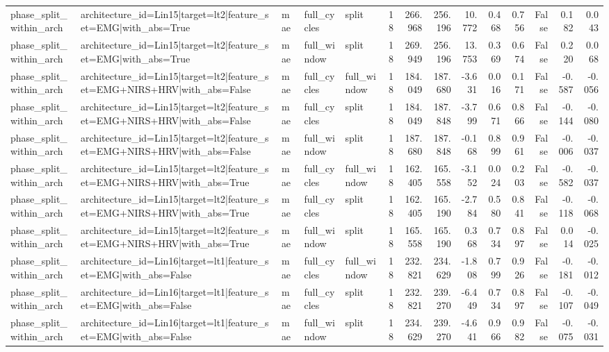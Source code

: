 \begin{table}
\begin{tabular}{lllllrrrrrrrrr}
phase_split_within_arch & architecture_id=Lin15|target=lt2|feature_set=EMG|with_abs=True & mae & full_cycles & split & 18 & 266.968 & 256.196 & 10.772 & 0.468 & 0.756 & False & 0.182 & 0.043 \\
phase_split_within_arch & architecture_id=Lin15|target=lt2|feature_set=EMG|with_abs=True & mae & full_window & split & 18 & 269.949 & 256.196 & 13.753 & 0.369 & 0.674 & False & 0.220 & 0.068 \\
phase_split_within_arch & architecture_id=Lin15|target=lt2|feature_set=EMG+NIRS+HRV|with_abs=False & mae & full_cycles & full_window & 18 & 184.049 & 187.680 & -3.631 & 0.016 & 0.171 & False & -0.587 & -0.056 \\
phase_split_within_arch & architecture_id=Lin15|target=lt2|feature_set=EMG+NIRS+HRV|with_abs=False & mae & full_cycles & split & 18 & 184.049 & 187.848 & -3.799 & 0.671 & 0.866 & False & -0.144 & -0.080 \\
phase_split_within_arch & architecture_id=Lin15|target=lt2|feature_set=EMG+NIRS+HRV|with_abs=False & mae & full_window & split & 18 & 187.680 & 187.848 & -0.168 & 0.899 & 0.961 & False & -0.006 & -0.037 \\
phase_split_within_arch & architecture_id=Lin15|target=lt2|feature_set=EMG+NIRS+HRV|with_abs=True & mae & full_cycles & full_window & 18 & 162.405 & 165.558 & -3.152 & 0.024 & 0.203 & False & -0.582 & -0.037 \\
phase_split_within_arch & architecture_id=Lin15|target=lt2|feature_set=EMG+NIRS+HRV|with_abs=True & mae & full_cycles & split & 18 & 162.405 & 165.190 & -2.784 & 0.580 & 0.841 & False & -0.118 & -0.068 \\
phase_split_within_arch & architecture_id=Lin15|target=lt2|feature_set=EMG+NIRS+HRV|with_abs=True & mae & full_window & split & 18 & 165.558 & 165.190 & 0.368 & 0.734 & 0.897 & False & 0.014 & -0.025 \\
phase_split_within_arch & architecture_id=Lin16|target=lt1|feature_set=EMG|with_abs=False & mae & full_cycles & full_window & 18 & 232.821 & 234.629 & -1.808 & 0.799 & 0.926 & False & -0.181 & -0.012 \\
phase_split_within_arch & architecture_id=Lin16|target=lt1|feature_set=EMG|with_abs=False & mae & full_cycles & split & 18 & 232.821 & 239.270 & -6.449 & 0.734 & 0.897 & False & -0.107 & -0.049 \\
phase_split_within_arch & architecture_id=Lin16|target=lt1|feature_set=EMG|with_abs=False & mae & full_window & split & 18 & 234.629 & 239.270 & -4.641 & 0.966 & 0.982 & False & -0.075 & -0.031 \\

\end{tabular}
\end{table}
